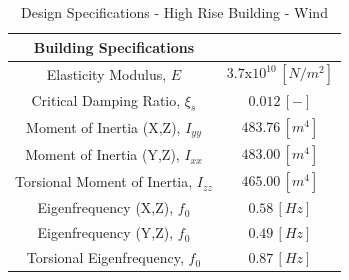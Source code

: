 \documentclass[11pt,a4paper,titlepage]{report}
\makeatletter
\renewcommand\paragraph{\@startsection{paragraph}{5}{\z@}%
  {3.25ex \@plus1ex \@minus.2ex}%
  {-1em}%
  {\normalfont\normalsize\bfseries}}
\makeatother
\begin{document}
\begin{table}[h]
    \centering
    \begin{tabular}{c|c}
    \hline
    \textbf{Building Specifications}  \\
        \hline
       Elasticity Modulus, $E$ & $3.7$x$10^{10}\, [N/m^2]$ \\
       Critical Damping Ratio, $\xi_s$ & $0.012\,[-]$ \\
       Moment of Inertia (X,Z), $I_{yy}$ & $483.76\,[m^4]$ \\
       Moment of Inertia (Y,Z), $I_{xx}$ & $483.00\,[m^4]$ \\
       Torsional Moment of Inertia, $I_{zz}$ & $465.00\,[m^4]$ \\
       Eigenfrequency (X,Z), $f_0$ & $0.58\, [Hz]$ \\
       Eigenfrequency (Y,Z), $f_0$ & $0.49 \,[Hz]$ \\
       Torsional Eigenfrequency, $f_0$ & $0.87\, [Hz]$ \\
    \end{tabular}
    \caption{Design Specifications - High Rise Building - Wind}
    \label{tab:wind high rise}
\end{table}
\end{document}
